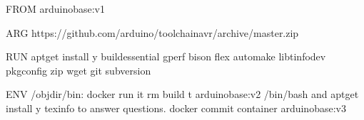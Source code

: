 \documentclass[letterpaper,10pt,english,openany,oneside]{sphinxmanual}
\begin{document}
\begin{sphinxVerbatim}[commandchars=\\\{\},numbers=left,firstnumber=1,stepnumber=1]
FROM arduino\PYGZus{}base:v1

ARG https://github.com/arduino/toolchain\PYGZhy{}avr/archive/master.zip

RUN apt\PYGZhy{}get install \PYGZhy{}y build\PYGZhy{}essential 
                       gperf 
                       bison 
                       flex 
                       automake 
                       libtinfo\PYGZhy{}dev 
                       pkg\PYGZhy{}config 
                       zip 
                       wget
                       git 
                       subversion 

ENV /objdir/bin:
 docker run \PYGZhy{}it \PYGZhy{}\PYGZhy{}rm build \PYGZhy{}t arduino\PYGZus{}base:v2 /bin/bash
 and apt\PYGZhy{}get install \PYGZhy{}y texinfo to answer questions.
  docker commit \PYGZlt{}container\PYGZgt{} arduino\PYGZus{}base:v3
\end{sphinxVerbatim}
\end{document}
